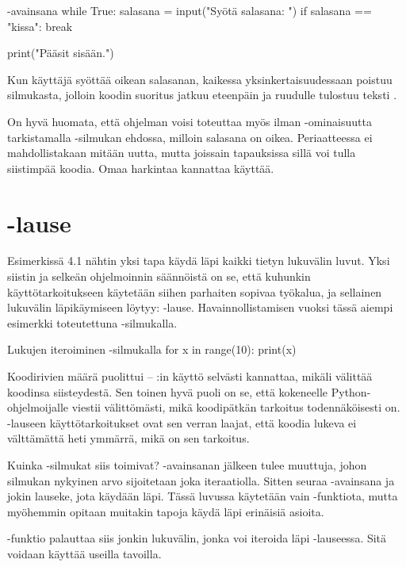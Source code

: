 \begin{example}{-avainsana}
while True:
	salasana = input("Syötä salasana: ")
	if salasana == "kissa":
		break

print("Pääsit sisään.")
\end{example}

Kun käyttäjä syöttää oikean salasanan, kaikessa yksinkertaisuudessaan  poistuu silmukasta, jolloin koodin suoritus jatkuu eteenpäin ja ruudulle tulostuu teksti .

On hyvä huomata, että ohjelman voisi toteuttaa myös ilman -ominaisuutta tarkistamalla -silmukan ehdossa, milloin salasana on oikea. Periaatteessa  ei mahdollistakaan mitään uutta, mutta joissain tapauksissa sillä voi tulla siistimpää koodia. Omaa harkintaa kannattaa käyttää.

\section{-lause}

Esimerkissä 4.1 nähtin yksi tapa käydä läpi kaikki tietyn lukuvälin luvut. Yksi siistin ja selkeän ohjelmoinnin säännöistä on se, että kuhunkin käyttötarkoitukseen käytetään siihen parhaiten sopivaa työkalua, ja sellainen lukuvälin läpikäymiseen löytyy: -lause. Havainnollistamisen vuoksi tässä aiempi esimerkki toteutettuna -silmukalla.

\begin{example}{Lukujen iteroiminen -silmukalla}
for x in range(10):
	print(x)
\end{example}

Koodirivien määrä puolittui – :in käyttö selvästi kannattaa, mikäli välittää koodinsa siisteydestä. Sen toinen hyvä puoli on se, että kokeneelle Python-ohjelmoijalle  viestii välittömästi, mikä koodipätkän tarkoitus todennäköisesti on. -lauseen käyttötarkoitukset ovat sen verran laajat, että koodia lukeva ei välttämättä heti ymmärrä, mikä on sen tarkoitus.

Kuinka -silmukat siis toimivat? -avainsanan jälkeen tulee muuttuja, johon silmukan nykyinen arvo sijoitetaan joka iteraatiolla. Sitten seuraa -avainsana ja jokin lauseke, jota käydään läpi. Tässä luvussa käytetään vain -funktiota, mutta myöhemmin opitaan muitakin tapoja käydä läpi erinäisiä asioita.

-funktio palauttaa siis jonkin lukuvälin, jonka voi iteroida läpi -lauseessa. Sitä voidaan käyttää useilla tavoilla.

